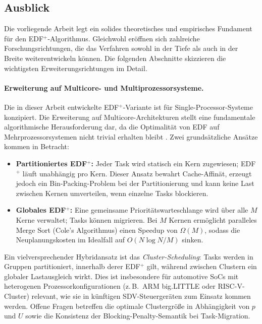 ﻿\documentclass[a4paper,12pt]{article}
\theoremstyle{definition}
\begin{document}
	\subsection{Ausblick}

	Die vorliegende Arbeit legt ein solides theoretisches und empirisches Fundament für den
	EDF$^+$-Algorithmus. Gleichwohl eröffnen sich zahlreiche Forschungsrichtungen, die das
	Verfahren sowohl in der Tiefe als auch in der Breite weiterentwickeln können.
	Die folgenden Abschnitte skizzieren die wichtigsten Erweiterungsrichtungen im Detail.

	\paragraph{Erweiterung auf Multicore- und Multiprozessorsysteme.}
	Die in dieser Arbeit entwickelte EDF$^+$-Variante ist für Single-Processor-Systeme
	konzipiert. Die Erweiterung auf Multicore-Architekturen stellt eine fundamentale
	algorithmische Herausforderung dar, da die Optimalität von EDF auf Mehrprozessorsystemen
	nicht trivial erhalten bleibt \cite{Buttazzo2011}. Zwei grundsätzliche Ansätze
	kommen in Betracht:
	\begin{itemize}
		\item \textbf{Partitioniertes EDF$^+$:} Jeder Task wird statisch ein Kern zugewiesen;
		      EDF$^+$ läuft unabhängig pro Kern. Dieser Ansatz bewahrt Cache-Affinät,
		      erzeugt jedoch ein Bin-Packing-Problem bei der Partitionierung und kann keine
		      Last zwischen Kernen umverteilen, wenn einzelne Tasks blockieren.
		\item \textbf{Globales EDF$^+$:} Eine gemeinsame Prioritätswarteschlange wird über
		      alle $M$ Kerne verwaltet; Tasks können migrieren. Bei $M$ Kernen ermöglicht
		      paralleles Merge Sort (Cole\rq{}s Algorithmus) einen Speedup von $\Omega(M)$,
		      sodass die Neuplanungskosten im Idealfall auf $O(N \log N / M)$ sinken.
	\end{itemize}
	Ein vielversprechender Hybridansatz ist das \emph{Cluster-Scheduling}: Tasks werden in
	Gruppen partitioniert, innerhalb derer EDF$^+$ gilt, während zwischen Clustern ein
	globaler Lastausgleich wirkt. Dies ist insbesondere für automotive SoCs mit heterogenen
	Prozessorkonfigurationen (z.\,B.\ ARM big.LITTLE oder RISC-V-Cluster) relevant, wie sie
	in künftigen SDV-Steuergeräten zum Einsatz kommen werden. Offene Fragen betreffen die
	optimale Clustergrö\ss{}e in Abhängigkeit von $p$ und $U$ sowie die Konsistenz der
	Blocking-Penalty-Semantik bei Task-Migration.
\end{document}
